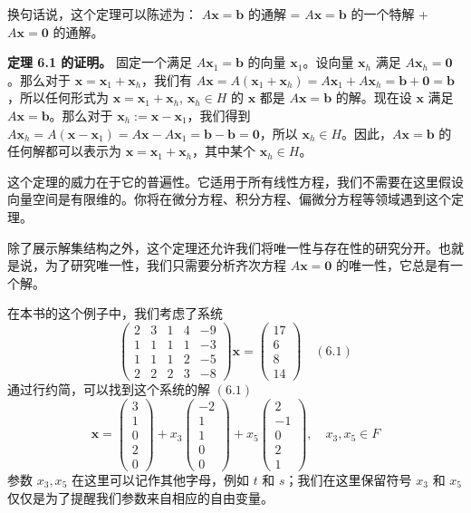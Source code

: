 换句话说，这个定理可以陈述为：
$A \mathbf{x} = \mathbf{b}$ 的通解 = $A \mathbf{x} = \mathbf{b}$ 的一个特解 + $A \mathbf{x} = \mathbf{0}$ 的通解。

\textbf{定理 6.1 的证明。} 固定一个满足 $A \mathbf{x}_1 = \mathbf{b}$ 的向量 $\mathbf{x}_1$。设向量 $\mathbf{x}_h$ 满足 $A \mathbf{x}_h = \mathbf{0}$。那么对于 $\mathbf{x} = \mathbf{x}_1 + \mathbf{x}_h$，我们有 $A \mathbf{x} = A(\mathbf{x}_1 + \mathbf{x}_h) = A \mathbf{x}_1 + A \mathbf{x}_h = \mathbf{b} + \mathbf{0} = \mathbf{b}$，所以任何形式为 $\mathbf{x} = \mathbf{x}_1 + \mathbf{x}_h$, $\mathbf{x}_h \in H$ 的 $\mathbf{x}$ 都是 $A \mathbf{x} = \mathbf{b}$ 的解。现在设 $\mathbf{x}$ 满足 $A \mathbf{x} = \mathbf{b}$。那么对于 $\mathbf{x}_h := \mathbf{x} - \mathbf{x}_1$，我们得到 $A \mathbf{x}_h = A(\mathbf{x} - \mathbf{x}_1) = A \mathbf{x} - A \mathbf{x}_1 = \mathbf{b} - \mathbf{b} = \mathbf{0}$，所以 $\mathbf{x}_h \in H$。因此，$A \mathbf{x} = \mathbf{b}$ 的任何解都可以表示为 $\mathbf{x} = \mathbf{x}_1 + \mathbf{x}_h$，其中某个 $\mathbf{x}_h \in H$。

这个定理的威力在于它的普遍性。它适用于所有线性方程，我们不需要在这里假设向量空间是有限维的。你将在微分方程、积分方程、偏微分方程等领域遇到这个定理。

除了展示解集结构之外，这个定理还允许我们将唯一性与存在性的研究分开。也就是说，为了研究唯一性，我们只需要分析齐次方程 $A \mathbf{x} = \mathbf{0}$ 的唯一性，它总是有一个解。

在本书的这个例子中，我们考虑了系统
$$
\begin{pmatrix} 2 & 3 & 1 & 4 & -9 \\ 1 & 1 & 1 & 1 & -3 \\ 1 & 1 & 1 & 2 & -5 \\ 2 & 2 & 2 & 3 & -8 \end{pmatrix} \mathbf{x} = \begin{pmatrix} 17 \\ 6 \\ 8 \\ 14 \end{pmatrix} \quad (6.1)
$$
通过行约简，可以找到这个系统的解 $(6.1)$
$$
\mathbf{x} = \begin{pmatrix} 3 \\ 1 \\ 0 \\ 2 \\ 0 \end{pmatrix} + x_3 \begin{pmatrix} -2 \\ 1 \\ 1 \\ 0 \\ 0 \end{pmatrix} + x_5 \begin{pmatrix} 2 \\ -1 \\ 0 \\ 2 \\ 1 \end{pmatrix}, \quad x_3, x_5 \in F
$$
参数 $x_3, x_5$ 在这里可以记作其他字母，例如 $t$ 和 $s$；我们在这里保留符号 $x_3$ 和 $x_5$ 仅仅是为了提醒我们参数来自相应的自由变量。

